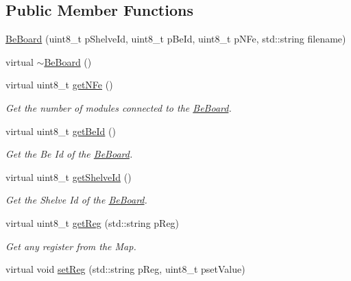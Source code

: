 \subsection*{Public Member Functions}
\begin{DoxyCompactItemize}
\item 
\hyperlink{class_ph2___hw_description_1_1_be_board_a57482a66173fb76260272c973ce72c9f}{Be\-Board} (uint8\-\_\-t p\-Shelve\-Id, uint8\-\_\-t p\-Be\-Id, uint8\-\_\-t p\-N\-Fe, std\-::string filename)
\item 
virtual \hyperlink{class_ph2___hw_description_1_1_be_board_a8ab3ac3c6f3aac002c33ef458779845e}{$\sim$\-Be\-Board} ()
\item 
virtual uint8\-\_\-t \hyperlink{class_ph2___hw_description_1_1_be_board_acee42e119fd170dd4291825b10a30436}{get\-N\-Fe} ()
\begin{DoxyCompactList}\small\item\em Get the number of modules connected to the \hyperlink{class_ph2___hw_description_1_1_be_board}{Be\-Board}. \end{DoxyCompactList}\item 
virtual uint8\-\_\-t \hyperlink{class_ph2___hw_description_1_1_be_board_a54e7ce5a90312b4b71f2af9d88e90dbb}{get\-Be\-Id} ()
\begin{DoxyCompactList}\small\item\em Get the Be Id of the \hyperlink{class_ph2___hw_description_1_1_be_board}{Be\-Board}. \end{DoxyCompactList}\item 
virtual uint8\-\_\-t \hyperlink{class_ph2___hw_description_1_1_be_board_addc30268e0f48b5a1408fd261d080f03}{get\-Shelve\-Id} ()
\begin{DoxyCompactList}\small\item\em Get the Shelve Id of the \hyperlink{class_ph2___hw_description_1_1_be_board}{Be\-Board}. \end{DoxyCompactList}\item 
virtual uint8\-\_\-t \hyperlink{class_ph2___hw_description_1_1_be_board_aa2e7c853b3df1fb6b3d320cdcf4bf85a}{get\-Reg} (std\-::string p\-Reg)
\begin{DoxyCompactList}\small\item\em Get any register from the Map. \end{DoxyCompactList}\item 
virtual void \hyperlink{class_ph2___hw_description_1_1_be_board_a7651d75760d934d237a2df889ba4e73c}{set\-Reg} (std\-::string p\-Reg, uint8\-\_\-t pset\-Value)

\end{DoxyCompactItemize}
